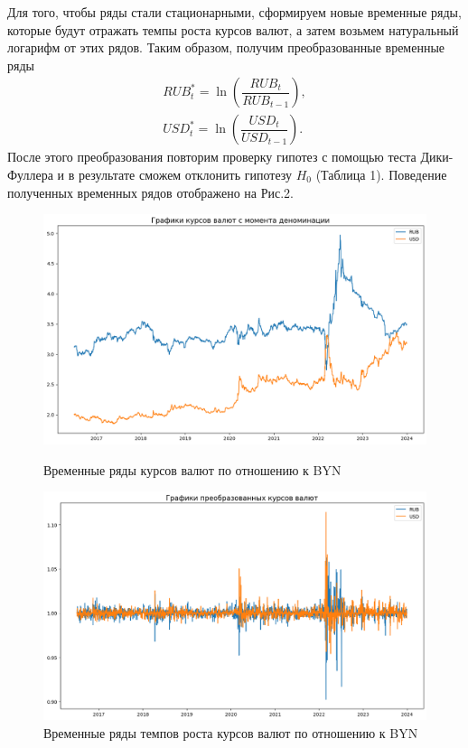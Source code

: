\documentclass[a4paper, 12pt]{extarticle}
\numberwithin{equation}{subsection}
\begin{document}
	Для того, чтобы ряды стали стационарными, сформируем новые временные ряды, которые будут отражать темпы роста курсов валют, а затем возьмем натуральный логарифм от этих рядов. Таким образом, получим преобразованные временные ряды
	\begin{eqnarray}
		RUB_t^* = \ln \left(\dfrac{RUB_t}{RUB_{t-1}}\right),\\
		USD_t^* = \ln \left(\dfrac{USD_t}{USD_{t-1}}\right).
	\end{eqnarray}	
	После этого преобразования повторим проверку гипотез с помощью теста Дики-Фуллера и в результате сможем отклонить гипотезу $H_0$ (Таблица 1). Поведение полученных временных рядов отображено на Рис.2.
	\newpage
	\begin{figure}[h]
		\centering
		\includegraphics[scale=0.5]{images/img01}
		\caption{Временные ряды курсов валют по отношению к BYN}
		\label{fig:img01}
		\includegraphics[scale=0.5]{images/img02}
		\caption{Временные ряды темпов роста курсов валют по отношению к BYN}
		\label{fig:img02}
	\end{figure}
	
\end{document}
